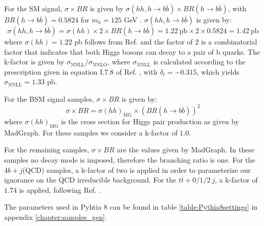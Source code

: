 For the SM signal, $\sigma\times BR$ is given by $\sigma(hh,h\rightarrow b\overline{b})\times BR(h\rightarrow b\overline{b})$, with $BR(h\rightarrow b\overline{b})=0.5824$ for $m_h=125$ GeV \cite{HiggsHandbook}. $\sigma(hh,h\rightarrow b\overline{b})$ is given by:
\begin{equation}
	\sigma(hh,h\rightarrow b\overline{b})=\sigma(hh)\times 2\times BR(h\rightarrow b\overline{b})=1.22~\text{pb}\times 2 \times 0.5824 = 1.42 ~\text{pb}
\end{equation}
where $\sigma(hh)=1.22$ pb follows from Ref. \cite{HxsNNLO} and the factor of $2$ is a combinatorial factor that indicates that both Higgs bosons can decay to a pair of b quarks. The k-factor is given by $\sigma_{\text{NNLL}}/\sigma_{\text{NNLO}}$, where $\sigma_{\text{NNLL}}$ is calculated according to the prescription given in equation I.7.8 of Ref. \cite{HiggsHandbook}, with $\delta_t=-0.315$, which yields $\sigma_{\text{NNLL}}=1.33$ pb.

For the BSM signal samples, $\sigma\times BR$ is given by:
\begin{equation}
	\sigma\times BR = \sigma(hh)_{\text{MG}}\times (BR(h\rightarrow b\overline{b}))^2
\end{equation}
where $\sigma(hh)_{\text{MG}}$ is the cross section for Higgs pair production as given by MadGraph. For these samples we consider a k-factor of $1.0$.

For the remaining samples, $\sigma\times BR$ are the values given by MadGraph. In these samples no decay mode is imposed, therefore the branching ratio is one. For the $4b+j$(QCD) samples, a k-factor of two is applied \cite{FCCEventProducer} in order to parameterize our ignorance on the QCD irreducible background. For the $t\overline{t}+0/1/2 ~j$, a k-factor of $1.74$ is applied, following Ref. \cite{FCCEventProducer}.

The parameters used in Pyhtia 8 can be found in table \ref{table:Pythia8settings} in appendix \ref{chapter:samples_gen}.

